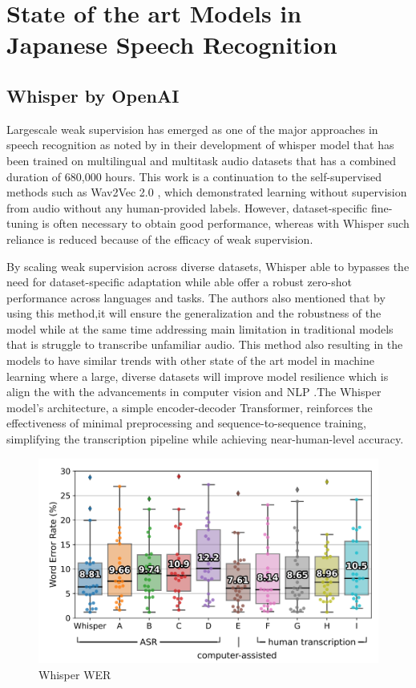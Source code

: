 \section{State of the art Models in Japanese Speech Recognition}
\subsection{Whisper by OpenAI}
Largescale weak supervision has emerged as one of the major approaches in speech recognition as noted by \textcite{radford2023robust} in their development of whisper model that has been trained on multilingual and multitask audio datasets that has a combined duration of 680,000 hours. This work is a continuation to the self-supervised methods such as Wav2Vec 2.0 \parencite{baevski2020wav2vec}, which demonstrated learning without supervision from audio without any human-provided labels. However, dataset-specific fine-tuning is often necessary to obtain good performance, whereas with Whisper such reliance is reduced because of the efficacy of weak supervision. 

By scaling weak supervision across diverse datasets, Whisper able to bypasses the need for dataset-specific adaptation while able offer a robust zero-shot performance across languages and tasks. The authors also mentioned that by using this method,it will ensure the generalization and the robustness of the model while at the same time addressing main limitation in traditional models that is struggle to transcribe unfamiliar audio. This method also resulting in the models to have similar trends with other state of the art model in  machine learning where a large, diverse datasets will improve model resilience which is align the with the advancements in computer vision \parencite{kolesnikov2020big} and NLP \parencite{radford2019language}.The Whisper model’s architecture, a simple encoder-decoder Transformer, reinforces the effectiveness of minimal preprocessing and sequence-to-sequence training, simplifying the transcription pipeline while achieving near-human-level accuracy.

\begin{figure}[!ht]
    \centering
    \includegraphics[width=.7\textwidth]{mainmatter//images/image.png}
    \caption{Whisper WER}
\end{figure}

